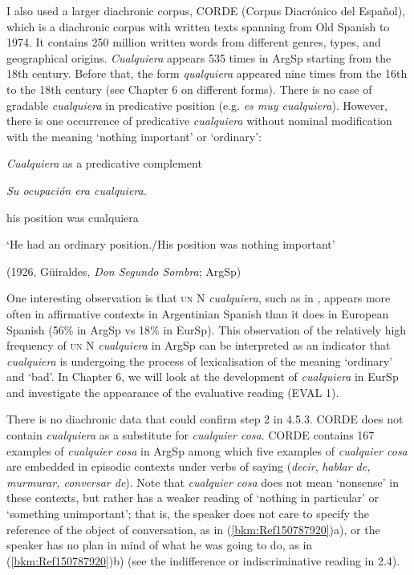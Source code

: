 \documentclass[output=paper]{langscibook}
\begin{document}
I also used a larger diachronic corpus, CORDE (Corpus Diacrónico del Español), which is a diachronic corpus with written texts spanning from Old Spanish to 1974. It contains 250 million written words from different genres, types, and geographical origins. \textit{Cualquiera} appears 535 times in ArgSp starting from the 18th century. Before that, the form \textit{qualquiera} appeared nine times from the 16th to the 18th century (see Chapter 6 on different forms). There is no case of gradable \textit{cualquiera} in predicative position (e.g. \textit{es muy cualquiera}). However, there is one occurrence of predicative \textit{cualquiera} without nominal modification with the meaning ‘nothing important’ or ‘ordinary’: 

\label{bkm:Ref150787886}  \textit{Cualquiera} as a predicative complement

    \textit{Su ocupación era cualquiera.}

    his position was cualquiera

    ‘He had an ordinary position./His position was nothing important’

\begin{styleListParagraph}
\textmd{    (1926, Güiraldes,} \textmd{\textit{Don Segundo Sombra}}\textmd{; ArgSp)}
\end{styleListParagraph}

One interesting observation is that \textsc{un} N \textit{cualquiera}, such as in , appears more often in affirmative contexts in Argentinian Spanish than it does in European Spanish (56\% in ArgSp vs 18\% in EurSp). This observation of the relatively high frequency of \textsc{un} N \textit{cualquiera} in ArgSp can be interpreted as an indicator that \textit{cualquiera} is undergoing the process of lexicalisation of the meaning ‘ordinary’ and ‘bad’. In Chapter 6, we will look at the development of \textit{cualquiera} in EurSp and investigate the appearance of the evaluative reading (EVAL 1).

  There is no diachronic data that could confirm step 2 in 4.5.3. CORDE does not contain \textit{cualquiera} as a substitute for \textit{cualquier cosa}. CORDE contains 167 examples of \textit{cualquier cosa} in ArgSp among which five examples of \textit{cualquier cosa} are embedded in episodic contexts under verbs of saying (\textit{decir}, \textit{hablar de, murmurar, conversar de}). Note that \textit{cualquier cosa} does not mean ‘nonsense’ in these contexts, but rather has a weaker reading of ‘nothing in particular’ or ‘something unimportant’; that is, the speaker does not care to specify the reference of the object of conversation, as in (\ref{bkm:Ref150787920})a), or the speaker has no plan in mind of what he was going to do, as in (\ref{bkm:Ref150787920})b) (see the indifference or indiscriminative reading in 2.4).
\end{document}
